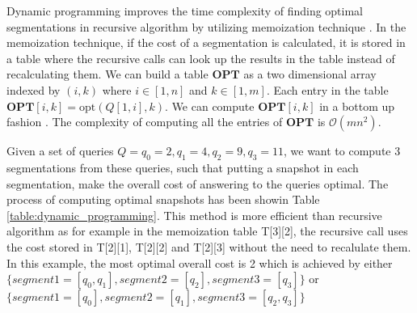 			Dynamic programming improves the time complexity of finding optimal segmentations in recursive algorithm by utilizing memoization technique \cite{johnsonbaugh2003algorithms}. In the memoization technique, if the cost of a segmentation is calculated, it is stored in a table where the recursive calls can look up the results in the table instead of recalculating them. We can build a table $\mathbf{OPT}$ as a two dimensional array
			indexed by $(i, k)$ where $i\in [1, n]$ and $k\in [1, m]$.  Each entry
			in the table $\mathbf{OPT}[i,k] = \mathrm{opt}(Q[1,i], k)$.
			We can compute $\mathbf{OPT}[i,k]$ in a bottom up fashion \cite{kossmann2000iterative}.
			The complexity of computing all the entries of $\mathbf{OPT}$ is $\mathcal{O}(mn^2)$.

			\begin{example}
				Given a set of queries $Q={q_0=2,q_1=4,q_2=9,q_3=11}$, we want to compute 3 segmentations from these queries, such that putting a snapshot in each segmentation, make the overall cost of answering to the queries optimal. The process of computing optimal snapshots has been showin Table \ref{table:dynamic_programming}. This method is more efficient than recursive algorithm as for example in the memoization table T[3][2], the recursive call uses the cost stored in T[2][1], T[2][2] and T[2][3] without the need to recalulate them. In this example, the most optimal overall cost is 2 which is achieved by either $\{segment1 =[q_0,q_1],segment2=[q_2],segment3=[q_3]\}$ or $\{segment1 =[q_0], segment2 = [q_1], segment3 = [q_2, q_3]\}$
			\label{example:dynamic_programming}
			\end{example}


